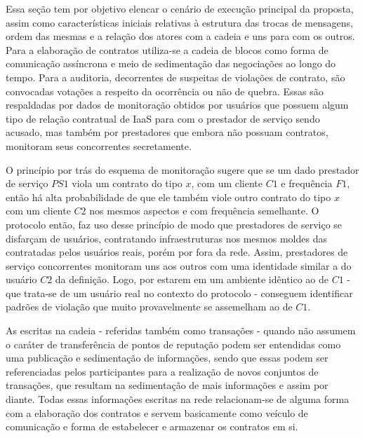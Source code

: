 Essa seção tem por objetivo elencar o cenário de execução principal da proposta, assim como características iniciais relativas à estrutura das trocas de mensagens, ordem das mesmas e a relação dos atores com a cadeia e uns para com os outros.
%
Para a elaboração de contratos utiliza-se a cadeia de blocos como forma de comunicação assíncrona e meio de sedimentação das negociações ao longo do tempo. Para a auditoria, decorrentes de suspeitas de violações de contrato, são convocadas votações a respeito da ocorrência ou não de quebra. Essas são respaldadas por dados de monitoração obtidos por usuários que possuem algum tipo de relação contratual de \ac{IaaS} para com o prestador de serviço sendo acusado, mas também por prestadores que embora não possuam contratos, monitoram seus concorrentes secretamente.

%
O princípio por trás do esquema de monitoração sugere que se um dado prestador de serviço $PS1$ viola um contrato do tipo $x$, com um cliente $C1$ e frequência $F1$, então há alta probabilidade de que ele também viole outro contrato do tipo $x$ com um cliente $C2$ nos mesmos aspectos e com frequência semelhante. 
%
O protocolo então, faz uso desse princípio de modo que prestadores de serviço se disfarçam de usuários, contratando infraestruturas nos mesmos moldes das contratadas pelos usuários reais, porém por fora da rede.
%
Assim, prestadores de serviço concorrentes monitoram uns aos outros com uma identidade similar a do usuário $C2$ da definição. Logo, por estarem em um ambiente idêntico ao de $C1$ - que trata-se de um usuário real no contexto do protocolo - conseguem identificar padrões de violação que muito provavelmente se assemelham ao de $C1$.
%

%
As escritas na cadeia - referidas também como transações - quando não assumem o caráter de transferência de pontos de reputação podem ser entendidas como uma publicação e sedimentação de informações, sendo que essas podem ser referenciadas pelos participantes para a realização de novos conjuntos de transações, que resultam na sedimentação de mais informações e assim por diante. Todas essas informações escritas na rede relacionam-se de alguma forma com a elaboração dos contratos e servem basicamente como veículo de comunicação e forma de estabelecer e armazenar os contratos em si. 


